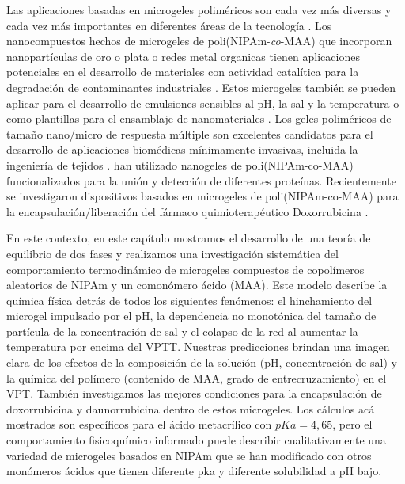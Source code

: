 Las aplicaciones basadas en microgeles polim\'ericos son cada vez m\'as diversas y cada vez m\'as importantes en diferentes \'areas de la tecnolog\'ia \addcite[plamper2017].
Los nanocompuestos hechos de microgeles de poli(NIPAm-\emph{co}-MAA) que incorporan nanopart\'iculas de oro o plata o redes metal organicas tienen aplicaciones potenciales en el desarrollo de materiales con actividad catal\'itica  para la degradación de contaminantes industriales .
Estos microgeles tambi\'en se pueden aplicar para el desarrollo de emulsiones sensibles al pH, la sal y la temperatura  o como plantillas para el ensamblaje de nanomateriales \addcite[Wong2009].
Los geles polim\'ericos de tama\~no nano/micro de respuesta m\'ultiple son excelentes candidatos para el desarrollo de aplicaciones biom\'edicas m\'inimamente invasivas, incluida la ingeniería de tejidos \addcite[Daly2020].
 han utilizado nanogeles de poli(NIPAm-co-MAA) funcionalizados para la uni\'on y detecci\'on de diferentes prote\'inas.
Recientemente se investigaron dispositivos basados en microgeles de poli(NIPAm-co-MAA) para la encapsulación/liberaci\'on del f\'armaco quimioterap\'eutico Doxorrubicina .

En este contexto, en este cap\'itulo mostramos el desarrollo de una teor\'ia de equilibrio de dos fases y realizamos una investigaci\'on sistem\'atica del comportamiento termodin\'amico de microgeles compuestos de copol\'imeros aleatorios de NIPAm y un comon\'omero \'acido (MAA).
Este modelo describe la qu\'imica f\'isica detr\'as de todos los siguientes fen\'omenos: el hinchamiento del microgel impulsado por el pH, la dependencia no monot\'onica del tama\~no de part\'icula de la concentraci\'on de sal y el colapso de la red al aumentar la temperatura por encima del VPTT.
Nuestras predicciones brindan una imagen clara de los efectos de la composici\'on de la soluci\'on (pH, concentración de sal) y la qu\'imica del pol\'imero (contenido de MAA, grado de entrecruzamiento) en el VPT.
Tambi\'en investigamos las mejores condiciones para la encapsulaci\'on de doxorrubicina y daunorrubicina dentro de estos microgeles.
Los c\'alculos  ac\'a mostrados son espec\'ificos para el \'acido metacr\'ilico con $pKa = 4,65$, pero el comportamiento fisicoqu\'imico informado puede describir cualitativamente una variedad de microgeles basados en NIPAm que se han modificado con otros monómeros \'acidos que tienen diferente pka y diferente solubilidad a pH bajo.



